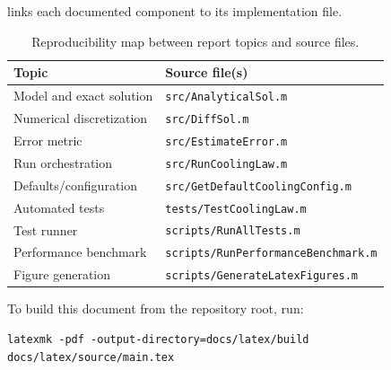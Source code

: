  links each documented component to its
implementation file.

\begin{table}[h]
\centering
\begin{tabular}{ll}
\toprule
Topic & Source file(s) \\
\midrule
Model and exact solution & \texttt{src/AnalyticalSol.m} \\
Numerical discretization & \texttt{src/DiffSol.m} \\
Error metric & \texttt{src/EstimateError.m} \\
Run orchestration & \texttt{src/RunCoolingLaw.m} \\
Defaults/configuration & \texttt{src/GetDefaultCoolingConfig.m} \\
Automated tests & \texttt{tests/TestCoolingLaw.m} \\
Test runner & \texttt{scripts/RunAllTests.m} \\
Performance benchmark & \texttt{scripts/RunPerformanceBenchmark.m} \\
Figure generation & \texttt{scripts/GenerateLatexFigures.m} \\
\bottomrule
\end{tabular}
\caption{Reproducibility map between report topics and source files.}
\label{tab:repro-map}
\end{table}

To build this document from the repository root, run:
\begin{verbatim}
latexmk -pdf -output-directory=docs/latex/build docs/latex/source/main.tex
\end{verbatim}
